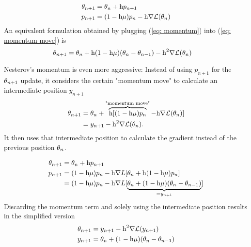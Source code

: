 \begin{definition}
	\begin{subequations}
	\begin{align}
		\theta_{n+1} &= \theta_n + \text{h} p_{n+1} \label{eq: momentum move}\\
		p_{n+1} &= (1-\text{h}\mu)p_n - \text{h}\nabla \mathcal{L}(\theta_n)
		\label{eq: momentum}
	\end{align}
	\end{subequations}
	An equivalent formulation obtained by plugging (\ref{eq: momentum}) into
	(\ref{eq: momentum move}) is
	\begin{align}
		\theta_{n+1}
		&= \theta_n + \text{h}(1-\text{h}\mu)(\theta_n - \theta_{n-1})
		- \text{h}^2\nabla \mathcal{L}(\theta_n)
	\end{align}
\end{definition}
%
Nesterov's momentum is even more aggressive: Instead of using \(p_{n+1}\) for
the \(\theta_{n+1}\) update, it considers the certain "momentum move"
to calculate an intermediate position \(y_{n+1}\)
%
\begin{align*}
	\theta_{n+1}
	&= \theta_n + \overbrace{\text{h} [(1-\text{h}\mu)p_n}^{\text{"momentum move"}}
	- \text{h}\nabla \mathcal{L}(\theta_n)] \\
	&= y_{n+1} - \text{h}^2 \nabla \mathcal{L}(\theta_n).
\end{align*}
%
It then uses that intermediate position to calculate the gradient instead of the
previous position \(\theta_n\).
%
\begin{definition}
	\begin{subequations}
	\begin{align}
		\theta_{n+1} &= \theta_n + \text{h} p_{n+1} \label{eq: nesterov momentum move}\\
		p_{n+1}
		&= (1-\text{h}\mu)p_n
		- \text{h}\nabla L[\theta_n + \text{h}(1-\text{h}\mu)p_n]
		\label{eq: nesterov momentum}
		\\ \nonumber
		&= (1-\text{h}\mu)p_n
		- \text{h}\nabla L[\underbrace{
			\theta_n + (1-\text{h}\mu)(\theta_n - \theta_{n-1})
		}_{= y_{n+1}}]
	\end{align}
	\end{subequations}
	Discarding the momentum term and solely using the intermediate position
	results in the simplified version
	\begin{subequations} \label{eq: nesterov intermediate position version}
	\begin{align}
		\theta_{n+1} &= y_{n+1} - \text{h}^2 \nabla \mathcal{L}(y_{n+1})\\
		y_{n+1}&= \theta_n + (1-\text{h}\mu)(\theta_n - \theta_{n-1})
	\end{align}
	\end{subequations}
\end{definition}
